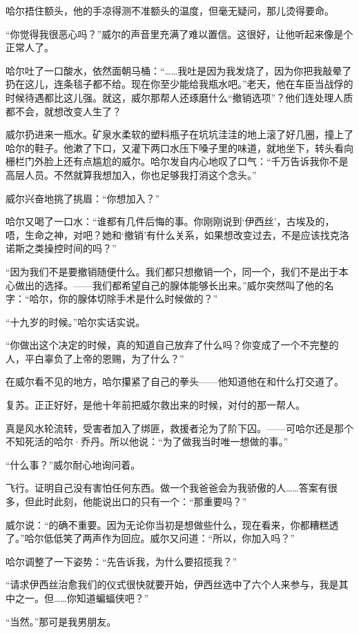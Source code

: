 \documentclass[../main]{subfiles}
\begin{document}
哈尔捂住额头，他的手凉得测不准额头的温度，但毫无疑问，那儿烫得要命。

“你觉得我很恶心吗？”威尔的声音里充满了难以置信。这很好，让他听起来像是个正常人了。

哈尔吐了一口酸水，依然面朝马桶：“……我吐是因为我发烧了，因为你把我敲晕了扔在这儿，连条毯子都不给。现在你至少能给我瓶水吧。”老天，他在车臣当战俘的时候待遇都比这儿强。就这，威尔那帮人还琢磨什么“撤销选项”？他们连处理人质都不会，就想改变人生了？

威尔扔进来一瓶水。矿泉水柔软的塑料瓶子在坑坑洼洼的地上滚了好几圈，撞上了哈尔的鞋子。他漱了下口，又灌下两口水压下嗓子里的味道，就地坐下，转头看向栅栏门外脸上还有点尴尬的威尔。哈尔发自内心地叹了口气：“千万告诉我你不是高层人员。不然就算我想加入，你也足够我打消这个念头。”

威尔兴奋地挑了挑眉：“你想加入？”

哈尔又喝了一口水：“谁都有几件后悔的事。你刚刚说到`伊西丝'，古埃及的，唔，生命之神，对吧？她和`撤销'有什么关系，如果想改变过去，不是应该找克洛诺斯之类操控时间的吗？”

“因为我们不是要撤销随便什么。我们都只想撤销一个，同一个，我们不是出于本心做出的选择。——我们都希望自己的腺体能够长出来。”威尔突然叫了他的名字：“哈尔，你的腺体切除手术是什么时候做的？”

“十九岁的时候。”哈尔实话实说。

“你做出这个决定的时候，真的知道自己放弃了什么吗？你变成了一个不完整的人，平白辜负了上帝的恩赐，为了什么？”

在威尔看不见的地方，哈尔攥紧了自己的拳头——他知道他在和什么打交道了。

复苏。正正好好，是他十年前把威尔救出来的时候，对付的那一帮人。

真是风水轮流转，受害者加入了绑匪，救援者沦为了阶下囚。——可哈尔还是那个不知死活的哈尔·乔丹。所以他说：“为了做我当时唯一想做的事。”

“什么事？”威尔耐心地询问着。

飞行。证明自己没有害怕任何东西。做一个我爸爸会为我骄傲的人……答案有很多，但此时此刻，他能说出口的只有一个：“那重要吗？”

威尔说：“的确不重要。因为无论你当初是想做些什么，现在看来，你都糟糕透了。”哈尔低低笑了两声作为回应。威尔又问道：“所以，你加入吗？”

哈尔调整了一下姿势：“先告诉我，为什么要招揽我？”

“请求伊西丝治愈我们的仪式很快就要开始，伊西丝选中了六个人来参与，我是其中之一。但……你知道蝙蝠侠吧？”

“当然。”那可是我男朋友。
\end{document}

